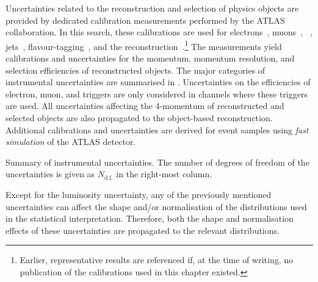 Uncertainties related to the reconstruction and selection of physics
objects are provided by dedicated calibration measurements performed
by the ATLAS collaboration. In this search, these calibrations are
used for electrons~\cite{EGAM-2018-01,TRIG-2018-05},
muons~\cite{MUON-2018-03}, \tauhadvis~\cite{ATLAS-CONF-2017-029},
jets~\cite{JETM-2018-05},
flavour-tagging~\cite{FTAG-2018-01,FTAG-2020-08,FTAG-2021-002}, and
the \pTmissAbs
reconstruction~\cite{ATLAS-CONF-2018-023}.\footnote{Earlier,
  representative results are referenced if, at the time of writing, no
  publication of the calibrations used in this chapter existed.} The
measurements yield calibrations and uncertainties for the momentum,
momentum resolution, and selection efficiencies of reconstructed
objects. The major categories of instrumental uncertainties are
summarised in . Uncertainties
on the efficiencies of electron, muon, and \tauhadvis triggers are
only considered in channels where these triggers are used. All
uncertainties affecting the 4-momentum of reconstructed and selected
objects are also propagated to the object-based \pTmissAbs
reconstruction. Additional calibrations and uncertainties are derived
for event samples using \emph{fast simulation} of the ATLAS detector.


\begin{table}[htbp]
  \centering

  \caption{Summary of instrumental uncertainties. The number of
    degrees of freedom of the uncertainties is given as
    $N_{\text{d.f.}}$ in the right-most column.}%
  \label{tab:experimental_uncertainties_2}

  \renewcommand{\arraystretch}{1.25}
  
\end{table}

Except for the luminosity uncertainty, any of the previously mentioned
uncertainties can affect the shape and/or normalisation of the
distributions used in the statistical interpretation. Therefore, both
the shape and normalisation effects of these uncertainties are
propagated to the relevant distributions.


